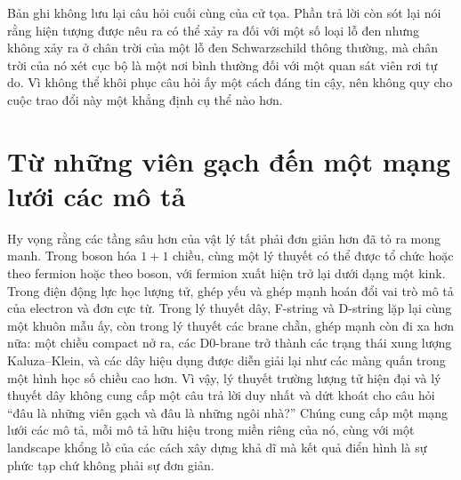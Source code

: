 
Bản ghi không lưu lại câu hỏi cuối cùng của cử tọa. Phần trả lời còn sót lại nói rằng hiện tượng được nêu ra có thể xảy ra đối với một số loại lỗ đen nhưng không xảy ra ở chân trời của một lỗ đen Schwarzschild thông thường, mà chân trời của nó xét cục bộ là một nơi bình thường đối với một quan sát viên rơi tự do. Vì không thể khôi phục câu hỏi ấy một cách đáng tin cậy, nên không quy cho cuộc trao đổi này một khẳng định cụ thể nào hơn.

\section{Từ những viên gạch đến một mạng lưới các mô tả}

Hy vọng rằng các tầng sâu hơn của vật lý tất phải đơn giản hơn đã tỏ ra mong manh. Trong boson hóa \(1+1\) chiều, cùng một lý thuyết có thể được tổ chức hoặc theo fermion hoặc theo boson, với fermion xuất hiện trở lại dưới dạng một kink. Trong điện động lực học lượng tử, ghép yếu và ghép mạnh hoán đổi vai trò mô tả của electron và đơn cực từ. Trong lý thuyết dây, F-string và D-string lặp lại cùng một khuôn mẫu ấy, còn trong lý thuyết các brane chẵn, ghép mạnh còn đi xa hơn nữa: một chiều compact nở ra, các D0-brane trở thành các trạng thái xung lượng Kaluza--Klein, và các dây hiệu dụng được diễn giải lại như các màng quấn trong một hình học số chiều cao hơn. Vì vậy, lý thuyết trường lượng tử hiện đại và lý thuyết dây không cung cấp một câu trả lời duy nhất và dứt khoát cho câu hỏi ``đâu là những viên gạch và đâu là những ngôi nhà?'' Chúng cung cấp một mạng lưới các mô tả, mỗi mô tả hữu hiệu trong miền riêng của nó, cùng với một landscape khổng lồ của các cách xây dựng khả dĩ mà kết quả điển hình là sự phức tạp chứ không phải sự đơn giản.
